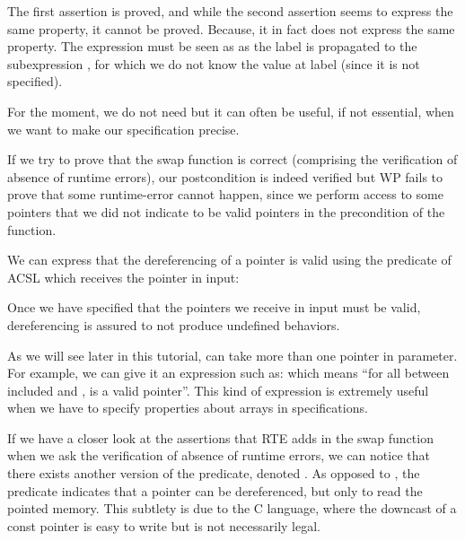 The first assertion is proved, and while the second assertion seems to
express the same property, it cannot be proved. Because, it in fact does not
express the same property. The expression
 must be seen as
 as the
label is propagated to the subexpression , for which we do
not know the value at label  (since it is not specified).


For the moment, we do not need  but it can
often be useful, if not essential, when we want to make our
specification precise.





If we try to prove that the swap function is correct (comprising the
verification of absence of runtime errors), our postcondition is indeed verified
but WP fails to prove that some runtime-error cannot happen, since we perform
access to some pointers that we did not indicate to be valid pointers in the
precondition of the function.

We can express that the dereferencing of a pointer is valid using the
 predicate of ACSL which receives the
pointer in input:






Once we have specified that the pointers we receive in input must be valid,
dereferencing is assured to not produce undefined behaviors.



As we will see later in this tutorial, 
can take more than one pointer in parameter. For example, we can give it
an expression such as:  which means
``for all  between included  and ,
 is a valid pointer''. This kind of expression is
extremely useful when we have to specify properties about arrays in
specifications.



If we have a closer look at the assertions that RTE adds in the swap function
when we ask the verification of absence of runtime errors, we can notice that
there exists another version of the 
predicate, denoted . As opposed to
, the predicate
 indicates that a pointer can be
dereferenced, but only to read the pointed memory. This subtlety is due to the C
language, where the downcast of a const pointer is easy to write but is not
necessarily legal.



